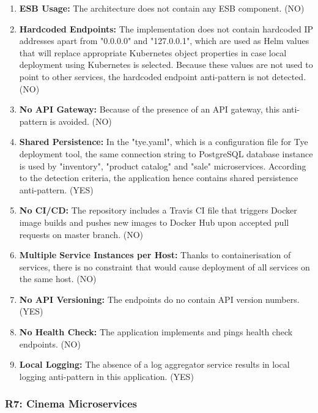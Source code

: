 \documentclass{Configuration_Files/PoliMi3i_thesis}
\begin{document}
\begin{enumerate}
    \item \textbf{ESB Usage:} The architecture does not contain any ESB component. (NO)
    
    \item \textbf{Hardcoded Endpoints:} The implementation does not contain hardcoded IP addresses apart from "0.0.0.0" and "127.0.0.1", which are used as Helm values that will replace appropriate Kubernetes object properties in case local deployment using Kubernetes is selected.
    Because these values are not used to point to other services, the hardcoded endpoint anti-pattern is not detected. (NO)
    
    \item \textbf{No API Gateway:} Because of the presence of an API gateway, this anti-pattern is avoided. (NO)
    
    \item \textbf{Shared Persistence:} In the "tye.yaml", which is a configuration file for Tye deployment tool, the same connection string to PostgreSQL database instance is used by "inventory", "product catalog" and "sale" microservices.
    According to the detection criteria, the application hence contains shared persistence anti-pattern. (YES)
    
    \item \textbf{No CI/CD:} The repository includes a Travis CI file that triggers Docker image builds and pushes new images to Docker Hub upon accepted pull requests on master branch. (NO)
    
    \item \textbf{Multiple Service Instances per Host:} Thanks to containerisation of services, there is no constraint that would cause deployment of all services on the same host. (NO)
    
    \item \textbf{No API Versioning:} The endpoints do no contain API version numbers. (YES)
    
    \item \textbf{No Health Check:} The application implements and pings health check endpoints. (NO)
    
    \item \textbf{Local Logging:} The absence of a log aggregator service results in local logging anti-pattern in this application. (YES)
\end{enumerate}

\subsubsection{R7: Cinema Microservices}
\label{subsubsec:R7}
\end{document}
